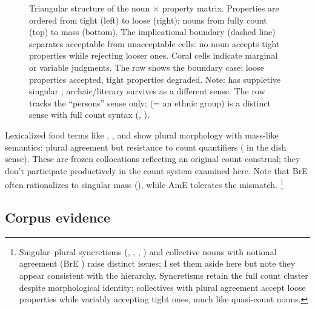 \documentclass[12pt,a4paper]{article}
\begin{document}
\begin{figure}[t]
\caption{Triangular structure of the noun $\times$ property matrix. Properties are ordered from tight (left) to loose (right); nouns from fully count (top) to mass (bottom). The implicational boundary (dashed line) separates acceptable from unacceptable cells: no noun accepts tight properties while rejecting looser ones. Coral cells indicate marginal or variable judgments. The  row shows the boundary case: loose properties accepted, tight properties degraded. Note:  has suppletive singular ; archaic/literary  survives as a different sense. The  row tracks the \enquote{persons} sense only;  (= an ethnic group) is a distinct sense with full count syntax (, ).}
\label{fig:matrix}
\end{figure}

Lexicalized food terms like , , and  show plural morphology with mass-like semantics: plural agreement but resistance to count quantifiers ( in the dish sense). These are frozen collocations reflecting an original count construal; they don't participate productively in the count system examined here. Note that BrE often rationalizes to singular mass (), while AmE tolerates the mismatch.%
\footnote{Singular--plural syncretisms (, , , ) and collective nouns with notional agreement (BrE ) raise distinct issues; I set them aside here but note they appear consistent with the hierarchy. Syncretisms retain the full count cluster despite morphological identity; collectives with plural agreement accept loose properties while variably accepting tight ones, much like quasi-count nouns.}


\subsection{Corpus evidence}\label{sec:corpus}
\end{document}
